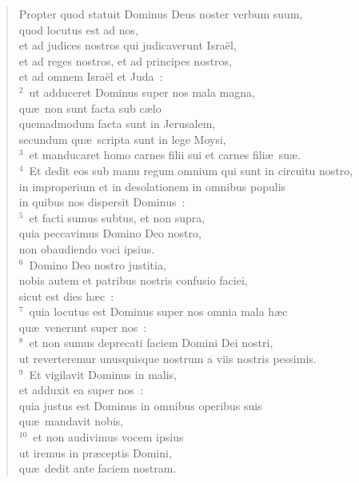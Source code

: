 \begin{flushleft}\begin{verse}\vspace{-19pt}Propter quod statuit Dominus Deus noster verbum suum,\\ quod locutus est ad nos,\\ et ad judices nostros qui judicaverunt Isra\"el,\\ et ad reges nostros, et ad principes nostros,\\ et ad omnem Isra\"el et Juda~:\\
${}^{2}$~ut adduceret Dominus super nos mala magna,\\ qu\ae\ non sunt facta sub c\ae lo\\ quemadmodum facta sunt in Jerusalem,\\ secundum qu\ae\ scripta sunt in lege Moysi,\\
${}^{3}$~et manducaret homo carnes filii sui et carnes fili\ae\ su\ae .\\
${}^{4}$~Et dedit eos sub manu regum omnium qui sunt in circuitu nostro,\\ in improperium et in desolationem in omnibus populis\\ in quibus nos dispersit Dominus~:\\
${}^{5}$~et facti sumus subtus, et non supra,\\ quia peccavimus Domino Deo nostro,\\ non obaudiendo voci ipsius.\\
${}^{6}$~Domino Deo nostro justitia,\\ nobis autem et patribus nostris confusio faciei,\\ sicut est dies h\ae c~:\\
${}^{7}$~quia locutus est Dominus super nos omnia mala h\ae c\\ qu\ae\ venerunt super nos~:\\
${}^{8}$~et non sumus deprecati faciem Domini Dei nostri,\\ ut reverteremur unusquisque nostrum a viis nostris pessimis.\\
${}^{9}$~Et vigilavit Dominus in malis,\\ et adduxit ea super nos~:\\ quia justus est Dominus in omnibus operibus suis\\ qu\ae\ mandavit nobis,\\
${}^{10}$~et non audivimus vocem ipsius\\ ut iremus in pr\ae ceptis Domini,\\ qu\ae\ dedit ante faciem nostram.\end{verse}\end{flushleft}


